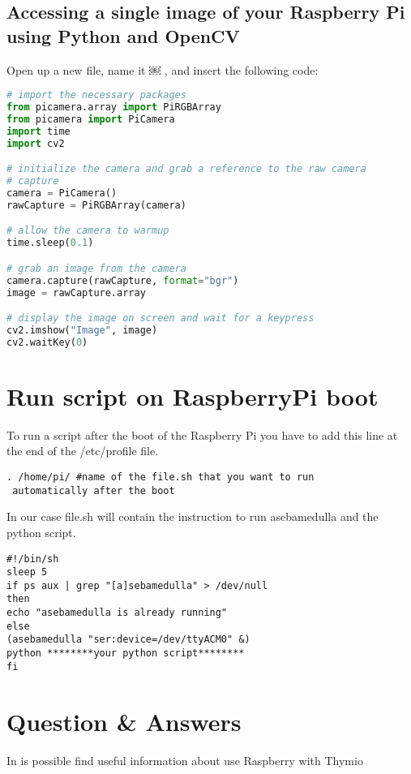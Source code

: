 \documentclass[12pt]{article}%
\begin{document}
	\subsection{Accessing a single image of your Raspberry Pi using Python and OpenCV}
	Open up a new file, name it ￼ , and insert the following code:
	\begin{lstlisting}[language=Python]
# import the necessary packages
from picamera.array import PiRGBArray
from picamera import PiCamera
import time
import cv2

# initialize the camera and grab a reference to the raw camera 
# capture 
camera = PiCamera()
rawCapture = PiRGBArray(camera)

# allow the camera to warmup
time.sleep(0.1)

# grab an image from the camera
camera.capture(rawCapture, format="bgr")
image = rawCapture.array

# display the image on screen and wait for a keypress 
cv2.imshow("Image", image)
cv2.waitKey(0)
	\end{lstlisting}

\section{Run script on RaspberryPi boot}
	To run a script after the boot of the Raspberry Pi you have to add this line at the end of the /etc/profile file.
\begin{lstlisting}
. /home/pi/ #name of the file.sh that you want to run
 automatically after the boot
\end{lstlisting}	 

	In our case file.sh will contain the instruction to run asebamedulla and the python script.
\begin{lstlisting}
#!/bin/sh
sleep 5
if ps aux | grep "[a]sebamedulla" > /dev/null
then
echo "asebamedulla is already running"
else
(asebamedulla "ser:device=/dev/ttyACM0" &)
python ********your python script********
fi
\end{lstlisting}
\section{Question \& Answers}
	In \cite{qa} is possible find useful information about use Raspberry with Thymio
	  
\end{document}
